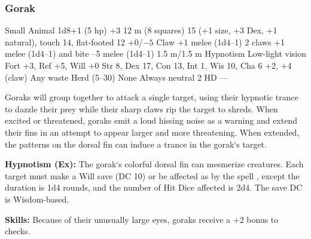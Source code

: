 \subsubsection{Gorak}
\begin{MonsterStats}
{Small Animal}
{1d8+1 (5 hp)}
{+3}
{12 m (8 squares)}
{15 (+1 size, +3 Dex, +1 natural), touch 14, flat-footed 12}
{+0/$-5$}
{Claw +1 melee (1d4--1)}
{2 claws +1 melee (1d4--1) and bite --5 melee (1d4--1)}
{1.5 m/1.5 m}
{Hypnotism}
{Low-light vision}
{Fort +3, Ref +5, Will +0}
{Str 8, Dex 17, Con 13, Int 1, Wis 10, Cha 6}
{ +2,  +4}
{ (claw)}
{Any waste}
{Herd (5--30)}
{\onehalf}
{None}
{Always neutral}
{2 HD}
{---}
\end{MonsterStats}


Goraks will group together to attack a single target, using their hypnotic trance to dazzle their prey while their sharp claws rip the target to shreds. When excited or threatened, goraks emit a loud hissing noise as a warning and extend their fins in an attempt to appear larger and more threatening. When extended, the patterns on the dorsal fin can induce a trance in the gorak‘s target.

\textbf{Hypnotism (Ex):} The gorak‘s colorful dorsal fin can mesmerize creatures. Each target must make a Will save (DC 10) or be affected as by the spell , except the duration is 1d4 rounds, and the number of Hit Dice affected is 2d4. The save DC is Wisdom-based.

\textbf{Skills:} Because of their unusually large eyes, goraks receive a +2 bonus to  checks.
